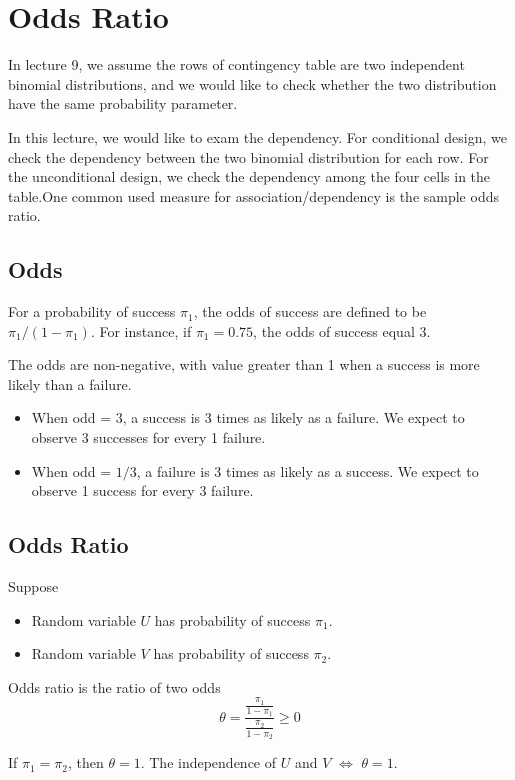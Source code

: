 \section{Odds Ratio}
In lecture 9, we assume the rows of contingency table are two independent binomial distributions, and we would like to check whether the two distribution have the same probability parameter.

In this lecture, we would like to exam the dependency. For conditional design, we check the dependency between the two binomial distribution for each row. For the unconditional design, we check the dependency among the four cells in the table.One common used measure for association/dependency is the sample odds ratio.

\subsection{Odds}
For a probability of success $\pi_1$, the odds of success are defined to be $\pi_1 / (1 - \pi_1)$. For instance, if $\pi_1 = 0.75$, the odds of success equal 3.

The odds are non-negative, with value greater than 1 when a success is more likely than a failure.
\begin{itemize}
	\item When odd = $3$, a success is 3 times as likely as a failure. We expect to observe 3 successes for every 1 failure.
	\item When odd = $1/3$, a failure is 3 times as likely as a success. We expect to observe 1 success for every 3 failure.
\end{itemize}

\subsection{Odds Ratio}
Suppose
\begin{itemize}
	\item Random variable $U$ has probability of success $\pi_1$.
	\item Random variable $V$ has probability of success $\pi_2$.
\end{itemize}
\begin{definition}
	Odds ratio is the ratio of two odds
	\[\theta = \frac{\frac{\pi_1}{1 - \pi_1}}{\frac{\pi_2}{1 - \pi_2}} \ge 0\]
\end{definition}

If $\pi_1 = \pi_2$, then $\theta = 1$. The independence of $U$ and $V$ $\iff$ $\theta = 1$.

